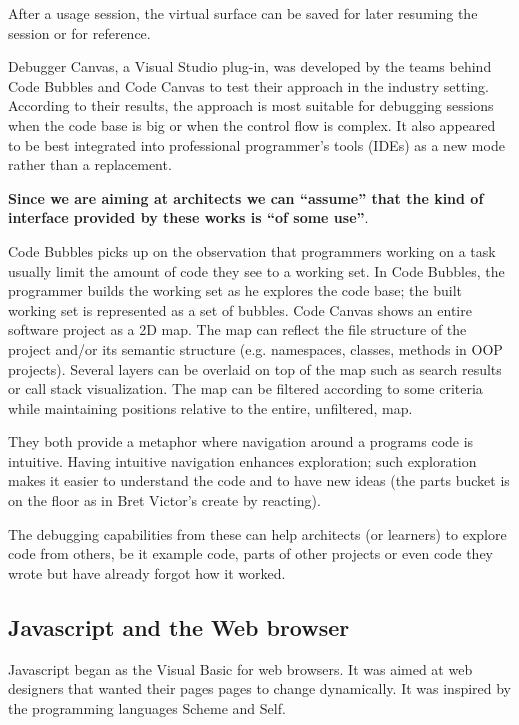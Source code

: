 \documentclass{./llncs2e/llncs}
\begin{document}
	After a usage session, the virtual surface can be saved for later resuming the session or for reference.

	Debugger Canvas, a Visual Studio plug-in, was developed by the teams behind Code Bubbles and Code Canvas to test their approach in the industry setting. 
	According to their results, the approach is most suitable for debugging sessions when the code base is big or when the control flow is complex. 
	It also appeared to be best integrated into professional programmer's tools (IDEs) as a new mode rather than a replacement.

	\textbf{Since we are aiming at architects we can ``assume'' that the kind of interface provided by these works is ``of some use''}.

	Code Bubbles picks up on the observation that programmers working on a task usually limit the amount of code they see to a working set. 
	In Code Bubbles, the programmer builds the working set as he explores the code base; the built working set is represented as a set of bubbles.
	Code Canvas shows an entire software project as a 2D map.
	The map can reflect the file structure of the project and/or its semantic structure (e.g. namespaces, classes, methods in OOP projects). Several layers can be overlaid on top of the map such as search results or call stack visualization. The map can be filtered according to some criteria while maintaining positions relative to the entire, unfiltered, map.

	They both provide a metaphor where navigation around a programs code is intuitive. 
	Having intuitive navigation enhances exploration; such exploration makes it easier to understand the code and to have new ideas (the parts bucket is on the floor as in Bret Victor's create by reacting).

	The debugging capabilities from these can help architects (or learners) to explore code from others, be it example code, parts of other projects or even code they wrote but have already forgot how it worked.

\subsection{Javascript and the Web browser}
	Javascript began as the Visual Basic for web browsers.
	It was aimed at web designers that wanted their pages pages to change dynamically. 
	It was inspired by the programming languages Scheme and Self.
\end{document}
